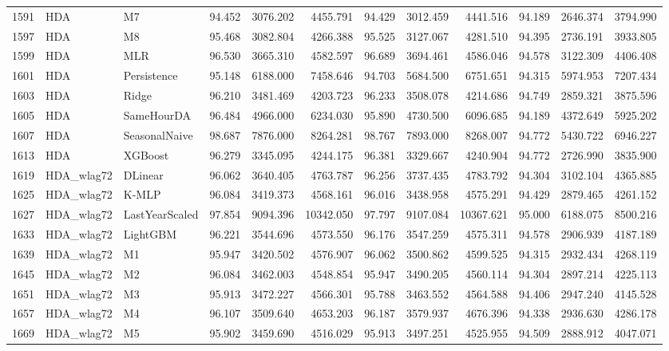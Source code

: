 \begin{tabular}{lllrrrrrrrrr}
1591 & HDA & M7 & 94.452 & 3076.202 & 4455.791 & 94.429 & 3012.459 & 4441.516 & 94.189 & 2646.374 & 3794.990 \\
1597 & HDA & M8 & 95.468 & 3082.804 & 4266.388 & 95.525 & 3127.067 & 4281.510 & 94.395 & 2736.191 & 3933.805 \\
1599 & HDA & MLR & 96.530 & 3665.310 & 4582.597 & 96.689 & 3694.461 & 4586.046 & 94.578 & 3122.309 & 4406.408 \\
1601 & HDA & Persistence & 95.148 & 6188.000 & 7458.646 & 94.703 & 5684.500 & 6751.651 & 94.315 & 5974.953 & 7207.434 \\
1603 & HDA & Ridge & 96.210 & 3481.469 & 4203.723 & 96.233 & 3508.078 & 4214.686 & 94.749 & 2859.321 & 3875.596 \\
1605 & HDA & SameHourDA & 96.484 & 4966.000 & 6234.030 & 95.890 & 4730.500 & 6096.685 & 94.189 & 4372.649 & 5925.202 \\
1607 & HDA & SeasonalNaive & 98.687 & 7876.000 & 8264.281 & 98.767 & 7893.000 & 8268.007 & 94.772 & 5430.722 & 6946.227 \\
1613 & HDA & XGBoost & 96.279 & 3345.095 & 4244.175 & 96.381 & 3329.667 & 4240.904 & 94.772 & 2726.990 & 3835.900 \\
1619 & HDA_wlag72 & DLinear & 96.062 & 3640.405 & 4763.787 & 96.256 & 3737.435 & 4783.792 & 94.304 & 3102.104 & 4365.885 \\
1625 & HDA_wlag72 & K-MLP & 96.084 & 3419.373 & 4568.161 & 96.016 & 3438.958 & 4575.291 & 94.429 & 2879.465 & 4261.152 \\
1627 & HDA_wlag72 & LastYearScaled & 97.854 & 9094.396 & 10342.050 & 97.797 & 9107.084 & 10367.621 & 95.000 & 6188.075 & 8500.216 \\
1633 & HDA_wlag72 & LightGBM & 96.221 & 3544.696 & 4573.550 & 96.176 & 3547.259 & 4575.311 & 94.578 & 2906.939 & 4187.189 \\
1639 & HDA_wlag72 & M1 & 95.947 & 3420.502 & 4576.907 & 96.062 & 3500.862 & 4599.525 & 94.315 & 2932.434 & 4268.119 \\
1645 & HDA_wlag72 & M2 & 96.084 & 3462.003 & 4548.854 & 95.947 & 3490.205 & 4560.114 & 94.304 & 2897.214 & 4225.113 \\
1651 & HDA_wlag72 & M3 & 95.913 & 3472.227 & 4566.301 & 95.788 & 3463.552 & 4564.588 & 94.406 & 2947.240 & 4145.528 \\
1657 & HDA_wlag72 & M4 & 96.107 & 3509.640 & 4653.203 & 96.187 & 3579.937 & 4676.396 & 94.338 & 2936.630 & 4286.178 \\
1669 & HDA_wlag72 & M5 & 95.902 & 3459.690 & 4516.029 & 95.913 & 3497.251 & 4525.955 & 94.509 & 2888.912 & 4047.071 \\

\end{tabular}

